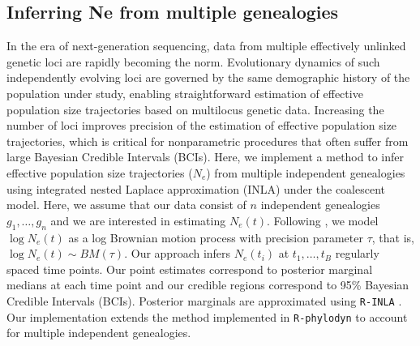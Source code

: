 \documentclass[english,titlepage]{article}
\begin{document}
  
\subsection*{Inferring Ne from multiple genealogies} 
In the era of next-generation sequencing, data from multiple effectively unlinked genetic loci are rapidly becoming the norm. Evolutionary dynamics of such independently evolving loci are governed by the same demographic history of the population under study, enabling straightforward estimation of effective
population size trajectories based on multilocus genetic data. Increasing the number of loci improves precision of the  estimation of effective population size trajectories, which is critical for nonparametric procedures that often suffer from large Bayesian Credible Intervals (BCIs). Here, we implement a method to infer effective population size trajectories ($N_{e}$) from multiple independent genealogies using integrated nested Laplace approximation (INLA) under the coalescent model. Here, we assume that our data consist of $n$ independent genealogies $g_{1},\ldots,g_{n}$ and we are interested in estimating $N_{e}(t)$. Following \citet{palacios2012INLA}, we model $\log N_{e}(t)$ as a log Brownian motion process with precision parameter $\tau$, that is, $\log N_{e}(t) \sim BM(\tau)$. Our approach infers $N_{e}(t_{i})$ at $t_{1},\ldots,t_{B}$ regularly spaced time points. Our point estimates correspond to posterior marginal medians at each time point and our credible regions correspond to 95\% Bayesian Credible Intervals (BCIs). Posterior marginals are approximated using \texttt{R-INLA} \citep{INLA_2009} . Our implementation extends the method implemented in \texttt{R-phylodyn} to account for multiple independent genealogies.
\end{document}
